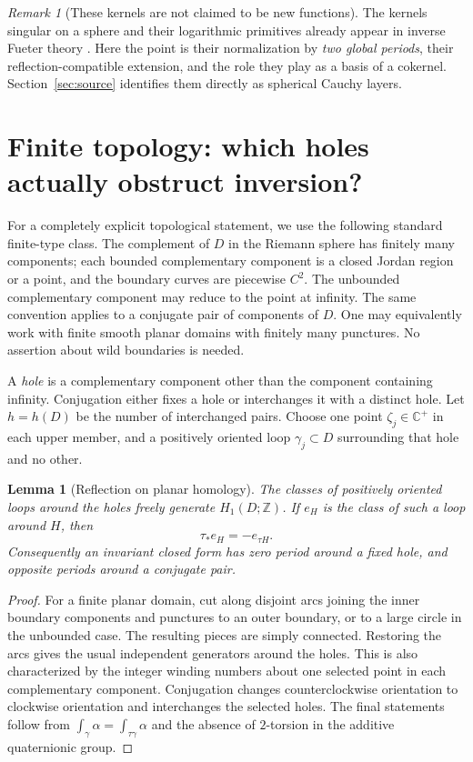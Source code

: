 \documentclass[11pt,a4paper]{article}
\numberwithin{equation}{section}
\newtheorem{lemma}[theorem]{Lemma}
\theoremstyle{definition}
\theoremstyle{remark}
\newtheorem{remark}[theorem]{Remark}
\newcommand{\C}{\mathbb C}
\begin{document}
\begin{remark}[These kernels are not claimed to be new functions]
The kernels singular on a sphere and their logarithmic primitives already
appear in inverse Fueter theory \cite{CPSS14}. Here the point is their
normalization by \emph{two global periods}, their reflection-compatible
extension, and the role they play as a basis of a cokernel. Section~\ref{sec:source}
identifies them directly as spherical Cauchy layers.
\end{remark}

\section{Finite topology: which holes actually obstruct inversion?}
\label{sec:topology}
For a completely explicit topological statement, we use the following
standard finite-type class. The complement of $D$ in the Riemann sphere
has finitely many components; each bounded complementary component is a
closed Jordan region or a point, and the boundary curves are piecewise
$C^2$. The unbounded complementary component may reduce to the point at
infinity. The same convention applies to a conjugate pair of components
of $D$. One may equivalently work with finite smooth planar domains with
finitely many punctures. No assertion about wild boundaries is needed.

A \emph{hole} is a complementary component other than the component
containing infinity. Conjugation either fixes a hole or interchanges it
with a distinct hole. Let $h=h(D)$ be the number of interchanged pairs.
Choose one point $\zeta_j\in\C^+$ in each upper member, and a positively
oriented loop $\gamma_j\subset D$ surrounding that hole and no other.

\begin{lemma}[Reflection on planar homology]
\label{lem:homology}
The classes of positively oriented loops around the holes freely generate
$H_1(D;\mathbb Z)$. If $e_H$ is the class of such a loop around $H$,
then
\[
 \tau_*e_H=-e_{\tau H}.
\]
Consequently an invariant closed form has zero period around a fixed
hole, and opposite periods around a conjugate pair.
\end{lemma}
\begin{proof}
For a finite planar domain, cut along disjoint arcs joining the inner
boundary components and punctures to an outer boundary, or to a large
circle in the unbounded case. The resulting pieces are simply connected.
Restoring the arcs gives the usual independent generators around the
holes. This is also characterized by the integer winding numbers about
one selected point in each complementary component. Conjugation changes
counterclockwise orientation to clockwise orientation and interchanges
the selected holes. The final statements follow from
$\int_\gamma\alpha=\int_{\tau\gamma}\alpha$ and the absence of
$2$-torsion in the additive quaternionic group.
\end{proof}
\end{document}
